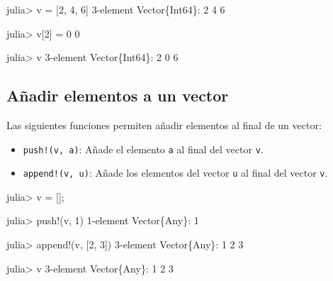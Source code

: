 \documentclass[
  letterpaper,
  DIV=11,
  numbers=noendperiod]{scrreprt}
\newenvironment{Shaded}{\begin{snugshade}}{\end{snugshade}}
\newcommand{\DataTypeTok}[1]{\textcolor[rgb]{0.68,0.00,0.00}{#1}}
\newcommand{\FloatTok}[1]{\textcolor[rgb]{0.68,0.00,0.00}{#1}}
\newcommand{\FunctionTok}[1]{\textcolor[rgb]{0.28,0.35,0.67}{#1}}
\newcommand{\NormalTok}[1]{\textcolor[rgb]{0.00,0.23,0.31}{#1}}
\newcommand{\OperatorTok}[1]{\textcolor[rgb]{0.37,0.37,0.37}{#1}}
\providecommand{\tightlist}{%
  \setlength{\itemsep}{0pt}\setlength{\parskip}{0pt}}\usepackage{longtable,booktabs,array}
\begin{document}
\begin{Shaded}
\begin{Highlighting}[]
\NormalTok{julia}\OperatorTok{\textgreater{}}\NormalTok{ v }\OperatorTok{=}\NormalTok{ [}\FloatTok{2}\NormalTok{, }\FloatTok{4}\NormalTok{, }\FloatTok{6}\NormalTok{]}
\FloatTok{3}\OperatorTok{{-}}\NormalTok{element }\DataTypeTok{Vector}\NormalTok{\{}\DataTypeTok{Int64}\NormalTok{\}}\OperatorTok{:}
 \FloatTok{2}
 \FloatTok{4}
 \FloatTok{6}

\NormalTok{julia}\OperatorTok{\textgreater{}}\NormalTok{ v[}\FloatTok{2}\NormalTok{] }\OperatorTok{=} \FloatTok{0}
\FloatTok{0}

\NormalTok{julia}\OperatorTok{\textgreater{}}\NormalTok{ v}
\FloatTok{3}\OperatorTok{{-}}\NormalTok{element }\DataTypeTok{Vector}\NormalTok{\{}\DataTypeTok{Int64}\NormalTok{\}}\OperatorTok{:}
 \FloatTok{2}
 \FloatTok{0}
 \FloatTok{6}
\end{Highlighting}
\end{Shaded}

\hypertarget{auxf1adir-elementos-a-un-vector}{%
\subsection{Añadir elementos a un
vector}\label{auxf1adir-elementos-a-un-vector}}

Las siguientes funciones permiten añadir elementos al final de un
vector:

\begin{itemize}
\tightlist
\item
  \texttt{push!(v,\ a)}: Añade el elemento \texttt{a} al final del
  vector \texttt{v}.
\item
  \texttt{append!(v,\ u)}: Añade los elementos del vector \texttt{u} al
  final del vector \texttt{v}.
\end{itemize}

\begin{Shaded}
\begin{Highlighting}[]
\NormalTok{julia}\OperatorTok{\textgreater{}}\NormalTok{ v }\OperatorTok{=}\NormalTok{ [];}

\NormalTok{julia}\OperatorTok{\textgreater{}} \FunctionTok{push!}\NormalTok{(v, }\FloatTok{1}\NormalTok{)}
\FloatTok{1}\OperatorTok{{-}}\NormalTok{element }\DataTypeTok{Vector}\NormalTok{\{}\DataTypeTok{Any}\NormalTok{\}}\OperatorTok{:}
 \FloatTok{1}

\NormalTok{julia}\OperatorTok{\textgreater{}} \FunctionTok{append!}\NormalTok{(v, [}\FloatTok{2}\NormalTok{, }\FloatTok{3}\NormalTok{])}
\FloatTok{3}\OperatorTok{{-}}\NormalTok{element }\DataTypeTok{Vector}\NormalTok{\{}\DataTypeTok{Any}\NormalTok{\}}\OperatorTok{:}
 \FloatTok{1}
 \FloatTok{2}
 \FloatTok{3}

\NormalTok{julia}\OperatorTok{\textgreater{}}\NormalTok{ v}
\FloatTok{3}\OperatorTok{{-}}\NormalTok{element }\DataTypeTok{Vector}\NormalTok{\{}\DataTypeTok{Any}\NormalTok{\}}\OperatorTok{:}
 \FloatTok{1}
 \FloatTok{2}
 \FloatTok{3}
\end{Highlighting}
\end{Shaded}
\end{document}
